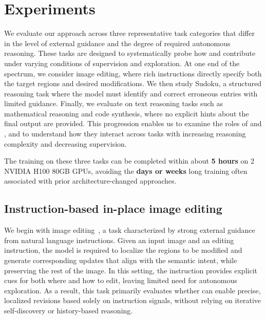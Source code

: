 \section{Experiments}
\label{sec:experiments}

We evaluate our approach across three representative task categories that differ in the level of external guidance and the degree of required autonomous reasoning. These tasks are designed to systematically probe how \methodfull and \temporalmethodfull contribute under varying conditions of supervision and exploration. At one end of the spectrum, we consider image editing, where rich instructions directly specify both the target regions and desired modifications. We then study Sudoku, a structured reasoning task where the model must identify and correct erroneous entries with limited guidance. Finally, we evaluate on text reasoning tasks such as mathematical reasoning and code synthesis, where no explicit hints about the final output are provided. This progression enables us to examine the roles of \method and \temporalmethod, and to understand how they interact across tasks with increasing reasoning complexity and decreasing supervision.

The training on these three tasks can be completed within about \textbf{5 hours} on 2 NVIDIA H100 80GB GPUs, avoiding the \textbf{days or weeks} long training often associated with prior architecture-changed approaches.



\subsection{Instruction-based in-place image editing}
\label{sec:image-editing-experiments}

We begin with image editing~\citep{brooks2023instructpix2pix,zhang2023magicbrush,sheynin2024emu,hertz2022prompt}, a task characterized by strong external guidance from natural language instructions. Given an input image and an editing instruction, the model is required to localize the regions to be modified and generate corresponding updates that align with the semantic intent, while preserving the rest of the image. In this setting, the instruction provides explicit cues for both where and how to edit, leaving limited need for autonomous exploration. As a result, this task primarily evaluates whether \methodfull can enable precise, localized revisions based solely on instruction signals, without relying on iterative self-discovery or history-based reasoning.

